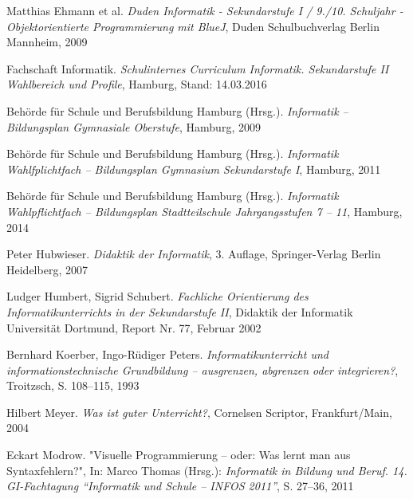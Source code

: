 \begin{thebibliography}{ABCDEF}
Matthias Ehmann et al. \emph{Duden Informatik - Sekundarstufe I / 9./10. Schuljahr - Objektorientierte Programmierung mit BlueJ}, Duden Schulbuchverlag Berlin Mannheim, 2009

Fachschaft Informatik. \emph{Schulinternes Curriculum Informatik. Sekundarstufe II Wahlbereich und Profile}, Hamburg, Stand: 14.03.2016


Behörde für Schule und Berufsbildung Hamburg (Hrsg.). \emph{Informatik -- Bildungsplan  Gymnasiale Oberstufe}, Hamburg, 2009

Behörde für Schule und Berufsbildung Hamburg (Hrsg.). \emph{Informatik Wahlfplichtfach -- Bildungsplan Gymnasium Sekundarstufe I}, Hamburg, 2011

Behörde für Schule und Berufsbildung Hamburg (Hrsg.). \emph{Informatik Wahlpflichtfach -- Bildungsplan Stadtteilschule Jahrgangsstufen 7 -- 11}, Hamburg, 2014

Peter Hubwieser. \emph{Didaktik der Informatik}, 3. Auflage, Springer-Verlag Berlin Heidelberg, 2007

Ludger Humbert, Sigrid Schubert. \emph{Fachliche Orientierung des Informatikunterrichts in der Sekundarstufe II}, Didaktik der Informatik Universität Dortmund, Report Nr. 77, Februar 2002

Bernhard Koerber, Ingo-Rüdiger Peters. \emph{Informatikunterricht und informationstechnische Grundbildung –
ausgrenzen, abgrenzen oder integrieren?}, Troitzsch, S. 108--115, 1993 

Hilbert Meyer. \emph{Was ist guter Unterricht?}, Cornelsen Scriptor, Frankfurt/Main, 2004

Eckart Modrow. "{Visuelle Programmierung -- oder: Was lernt man aus Syntaxfehlern?}", In: Marco Thomas (Hrsg.): \emph{Informatik in Bildung und Beruf. 14. GI-Fachtagung "`Informatik und Schule – INFOS 2011"'}, S. 27--36, 2011

%


\end{thebibliography}
